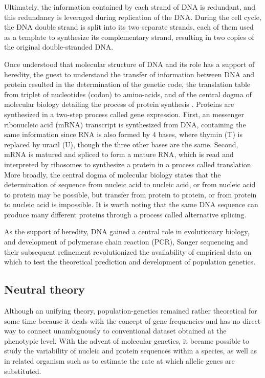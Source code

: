 Ultimately, the information contained by each strand of \acrshort{DNA} is redundant, and this redundancy is leveraged during replication of the \acrshort{DNA}.
During the cell cycle, the \acrshort{DNA} double strand is split into its two separate strands, each of them used as a template to synthesize its complementary strand, resulting in two copies of the original double-stranded \acrshort{DNA}.

Once understood that molecular structure of \acrshort{DNA} and its role has a support of heredity, the guest to understand the transfer of information between \acrshort{DNA} and protein \cite{Crick1958} resulted in the determination of the genetic code, the translation table from triplet of nucleotides (\gls{codon}) to amino-acids, and of the central dogma of molecular biology detailing the process of protein synthesis \cite{Crick1970}.
Proteins are synthesized in a two-step process called gene expression.
First, an messenger ribonucleic acid (mRNA) transcript is synthesized from \acrshort{DNA}, containing the same information since \acrshort{RNA} is also formed by 4 bases, where thymin (T) is replaced by uracil (U), though the three other bases are the same. 
Second, mRNA is matured and spliced to form a mature \acrshort{RNA}, which is read and interpreted by ribosomes to synthesize a protein in a process called translation. 
More broadly, the central dogma of molecular biology states that the determination of sequence from nucleic acid to nucleic acid, or from nucleic acid to protein may be possible, but transfer from protein to protein, or from protein to nucleic acid is impossible.
It is worth noting that the same \acrshort{DNA} sequence can produce many different proteins through a process called alternative splicing.

As the support of heredity, \acrshort{DNA} gained a central role in evolutionary biology, and development of polymerase chain reaction (PCR), Sanger sequencing and their subsequent refinement revolutionized the availability of empirical data on which to test the theoretical prediction and development of population genetics.

\subsection{Neutral theory}

Although an unifying theory, population-genetics remained rather theoretical for some time because it deals with the concept of gene frequencies and has no direct way to connect unambiguously to conventional dataset obtained at the phenotypic level.
With the advent of molecular genetics, it became possible to study the variability of nucleic and protein sequences within a species, as well as in related organism such as to estimate the rate at which allelic genes are substituted.

